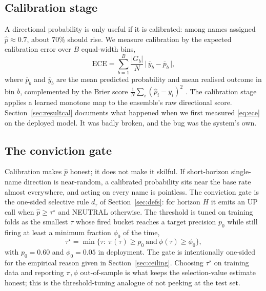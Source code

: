 \documentclass{sbc2023}%
\theoremstyle{definition}
\theoremstyle{plain}
\newcommand{\ece}{\mathrm{ECE}}
\newcommand{\Pup}{\hat p}
\begin{document}
\subsection{Calibration stage}
\label{sec:cal}
A directional probability is only useful if it is calibrated: among names assigned
$\Pup\approx0.7$, about 70\% should rise. We measure calibration by the expected
calibration error over $B$ equal-width bins,
\begin{equation}
\label{eq:ece}
\ece=\sum_{b=1}^{B}\frac{|G_b|}{N}\,\big|\,\overline{y}_b-\overline{p}_b\,\big|,
\end{equation}
where $\overline{p}_b$ and $\overline{y}_b$ are the mean predicted probability and mean
realised outcome in bin $b$, complemented by the Brier score
$\tfrac1N\sum_i(\Pup_i-y_i)^2$ \citep{brier1950}. The calibration stage applies a learned
monotone map to the ensemble's raw directional score. Section~\ref{sec:resultcal}
documents what happened when we first measured \eqref{eq:ece} on the deployed model.
It was badly broken, and the bug was the system's own.

\subsection{The conviction gate}
\label{sec:gate}
Calibration makes $\Pup$ honest; it does not make it skilful. If short-horizon
single-name direction is near-random, a calibrated probability sits near the base rate
almost everywhere, and acting on every name is pointless. The conviction gate is the
one-sided selective rule $d_\tau$ of Section~\ref{sec:defs}: for horizon $H$ it emits
an UP call when $\Pup\ge\tau^\star$ and NEUTRAL otherwise. The threshold is tuned on
training folds as the smallest $\tau$ whose fired bucket reaches a target precision
$p_0$ while still firing at least a minimum fraction $\phi_0$ of the time,
\begin{equation}
\label{eq:tau}
\tau^\star=\min\big\{\tau:\ \pi(\tau)\ge p_0\ \text{and}\ \phi(\tau)\ge\phi_0\big\},
\end{equation}
with $p_0=0.60$ and $\phi_0=0.05$ in deployment. The gate is intentionally one-sided
for the empirical reason given in Section~\ref{sec:ceiling}. Choosing $\tau^\star$ on
training data and reporting $\pi,\phi$ out-of-sample is what keeps the selection-value
estimate honest; this is the threshold-tuning analogue of not peeking at the test set.
\end{document}
